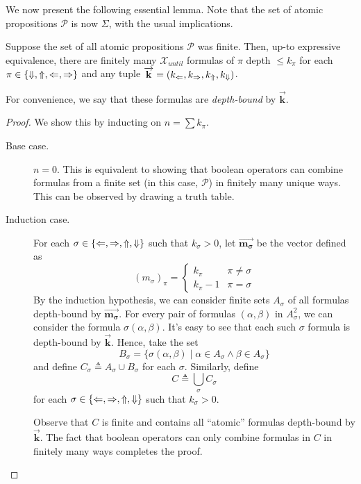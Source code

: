 \documentclass[a4paper,UKenglish,cleveref, autoref, thm-restate, numberwithinsect]{lipics-v2021}
\def\Larrow{\ensuremath\mathord{\Leftarrow}}
\def\Rarrow{\ensuremath\mathord{\Rightarrow}}
\def\Uarrow{\ensuremath\mathord{\Uparrow}}
\def\Darrow{\ensuremath\mathord{\Downarrow}}
\newcommand{\myvec}[1]{\overrightarrow{\mathbf{#1}}}
\begin{document}
We now present the following essential lemma. Note that the set of atomic propositions $\mathcal{P}$ is now $\Sigma$, with the usual implications.
\begin{lemma}
    \label{lemma:count-limiter-efgames}
    Suppose the set of all atomic propositions $\mathcal{P}$ was finite. Then, up-to expressive equivalence, there are finitely many $\mathcal{X}_{until}$ formulas of $\pi$ depth $\leq k_\pi$ for each $\pi \in \{\Darrow, \Uarrow, \Larrow, \Rarrow\}$ and any tuple $\myvec{k} = (k_{\Larrow}, k_{\Rarrow}, k_{\Uarrow}, k_{\Darrow})$.
    \begin{remark*}
        For convenience, we say that these formulas are \emph{depth-bound} by $\myvec{k}$.
    \end{remark*}
\end{lemma}
\begin{proof}
    We show this by inducting on $n = \sum k_\pi$.
    \begin{description}
        \item[Base case.] $n = 0$. This is equivalent to showing that boolean operators can combine formulas from a finite set (in this case, $\mathcal{P}$) in finitely many unique ways. This can be observed by drawing a truth table.
        \item[Induction case.]
            For each $\sigma \in \{\Larrow, \Rarrow, \Uarrow, \Darrow\}$ such that $k_\sigma > 0$, let $\myvec{m_\sigma}$ be the vector defined as
            \begin{equation}
                \label{eq:m-sigma-defn}
                {(m_\sigma)}_\pi = \begin{cases}
                    k_\pi & \pi \neq \sigma \\
                    k_\pi - 1 & \pi = \sigma
                \end{cases}
            \end{equation}
            By the induction hypothesis, we can consider finite sets $A_\sigma$ of all formulas depth-bound by $\myvec{m_\sigma}$. For every pair of formulas $(\alpha, \beta)$ in $A_\sigma^2$, we can consider the formula $\sigma(\alpha, \beta)$. It's easy to see that each such $\sigma$ formula is depth-bound by $\myvec{k}$. Hence, take the set
            \begin{equation*}
                B_\sigma = \{\sigma(\alpha, \beta) \mid \alpha \in A_\sigma \land \beta \in A_\sigma \}
            \end{equation*}
            and define $C_\sigma \triangleq A_\sigma \cup B_\sigma$ for each $\sigma$. Similarly, define
            \begin{equation*}
                C \triangleq \bigcup_\sigma C_\sigma
            \end{equation*}
            for each $\sigma \in \{\Larrow, \Rarrow, \Uarrow, \Darrow\}$ such that $k_\sigma > 0$.

            Observe that $C$ is finite and contains all ``atomic'' formulas depth-bound by $\myvec{k}$. The fact that boolean operators can only combine formulas in $C$ in finitely many ways completes the proof.
    \end{description}
\end{proof}
\end{document}
